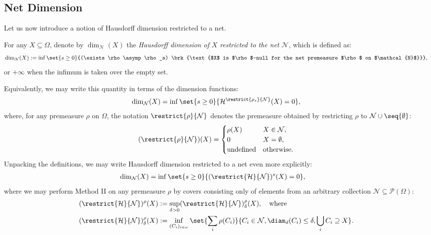 \subsection{Net Dimension}

Let us now introduce a notion of Hausdorff dimension restricted to a net.

\begin{definition}
    For any $X \subseteq \Omega$, denote by $\dim_{\mathcal{N}}(X)$ the \textit{Hausdorff dimension of $X$ restricted to the net $\mathcal{N}$}, which is defined as:
    \begin{align*}
        \dim_{\mathcal{N}}(X) := \inf \set{s \geq 0}{(\exists \rho \asymp \rho_s) \brk{\text{$X$ is $\rho$-null for the net premeasure $\rho$ on $\mathcal{N}$}}},
    \end{align*}
    or $+\infty$ when the infimum is taken over the empty set. 
\end{definition}
Equivalently, we may write this quantity in terms of the dimension functions:
\begin{align*}
    \dim_{\mathcal{N}}(X) = \inf \set{s \geq 0}{\mathcal{H}^{\restrict{\rho_s}{\mathcal{N}}} (X) = 0},
\end{align*}
where, for any premeasure $\rho$ on $\Omega$, the notation $\restrict{\rho}{\mathcal{N}}$ denotes the premeasure obtained by restricting $\rho$ to $\mathcal{N} \cup \seq{\emptyset}$:
\begin{align*}
    (\restrict{\rho}{\mathcal{N}})(X) = 
    \begin{cases}
        \rho(X) & X \in \mathcal{N},\\
        0 & X = \emptyset,\\
        \text{undefined} & \text{otherwise}.
    \end{cases}
\end{align*}
Unpacking the definitions, we may write Hausdorff dimension restricted to a net even more explicitly:
\begin{align*}
    \dim_{\mathcal{N}}(X) &= \inf \set{s \geq 0}{(\restrict{\mathcal{H}}{\mathcal{N}})^s(X) = 0},
\end{align*}
where we may perform Method II on any premeasure $\rho$ by covers consisting only of elements from an arbitrary collection $\mathcal{N} \subseteq \mathcal{P}(\Omega)$:
\begin{align*}
    (\restrict{\mathcal{H}}{\mathcal{N}})^\rho(X) &:= \sup_{\delta > 0} (\restrict{\mathcal{H}}{\mathcal{N}})^\rho_{\delta}(X), \quad \text{where}\\
    (\restrict{\mathcal{H}}{\mathcal{N}})^\rho_{\delta}(X) &:= \inf_{(C_i)_{i \in \omega}} \set{\sum_{i} \rho(C_i)}{C_i \in \mathcal{N}, \diam_d(C_i) \leq \delta, \bigcup_i C_i \supseteq X}.
\end{align*}
